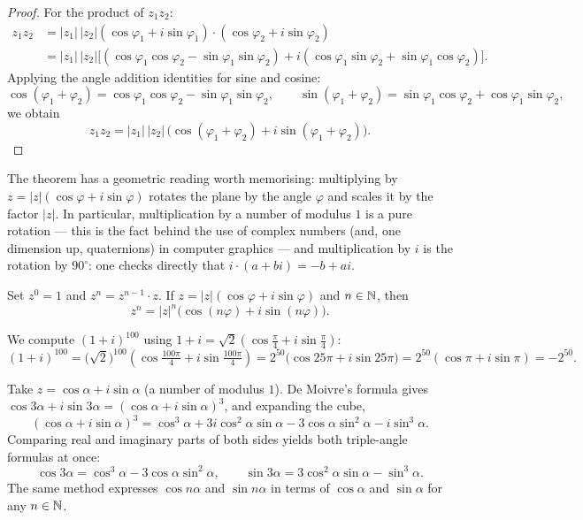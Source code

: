 \begin{proof}
For the product of $z_1 z_2$:
\begin{align*}
z_1 z_2 &= |z_1|\,|z_2|(\cos \varphi_1 + i\sin\varphi_1) \cdot (\cos \varphi_2 + i\sin\varphi_2) \\
&= |z_1|\,|z_2| \Big[ (\cos\varphi_1 \cos\varphi_2 - \sin\varphi_1 \sin\varphi_2) + i (\cos\varphi_1 \sin\varphi_2 + \sin\varphi_1 \cos\varphi_2) \Big].
\end{align*}
Applying the angle addition identities for sine and cosine:
\[
\cos(\varphi_1 + \varphi_2) = \cos\varphi_1 \cos\varphi_2 - \sin\varphi_1 \sin\varphi_2, \qquad
\sin(\varphi_1 + \varphi_2) = \sin\varphi_1 \cos\varphi_2 + \cos\varphi_1 \sin\varphi_2,
\]
we obtain
\[
z_1 z_2 = |z_1|\,|z_2|\,\big(\cos (\varphi_1+\varphi_2) + i\sin(\varphi_1+\varphi_2)\big).
\]

\end{proof}

\begin{remark}
The theorem has a geometric reading worth memorising: multiplying by $z = |z|(\cos\varphi+i\sin\varphi)$
rotates the plane by the angle $\varphi$ and scales it by the factor $|z|$. In particular, multiplication by
a number of modulus $1$ is a pure rotation — this is the fact behind the use of complex numbers (and, one
dimension up, quaternions) in computer graphics — and multiplication by $i$ is the rotation by $90^\circ$:
one checks directly that $i\cdot(a+bi) = -b+ai$.
\end{remark}

\begin{theorem}
Set $z^0 = 1$ and $z^n = z^{n-1}\cdot z$. If $z=|z|(\cos \varphi + i\sin\varphi)$ and $n\in \mathbb{N}$, then
\[
z^n = |z|^n \big(\cos (n\varphi) + i\sin(n \varphi)\big).
\]
\end{theorem}

\begin{example}
We compute $(1+i)^{100}$ using $1+i = \sqrt{2}(\cos\tfrac\pi4 + i\sin\tfrac\pi4)$:
\[
(1+i)^{100} = \big(\sqrt{2}\big)^{100}\left(\cos\tfrac{100\pi}{4} + i \sin\tfrac{100\pi}{4}\right)
= 2^{50}\big(\cos 25\pi +i \sin 25\pi\big) = 2^{50}(\cos \pi + i \sin \pi) = -2^{50}.
\]
\end{example}

\begin{example}
Take $z = \cos\alpha + i\sin\alpha$ (a number of modulus $1$). De Moivre's formula gives
$\cos 3\alpha + i \sin 3\alpha = (\cos\alpha + i \sin \alpha)^3$, and expanding the cube,
\[
(\cos\alpha + i\sin\alpha)^3
= \cos^3\alpha + 3i\cos^2\alpha \sin\alpha - 3\cos\alpha\sin^2\alpha - i\sin^3\alpha.
\]
Comparing real and imaginary parts of both sides yields both triple-angle formulas at once:
\[
\cos 3\alpha = \cos^3\alpha - 3\cos\alpha \sin^2\alpha, \qquad
\sin 3\alpha = 3\cos^2\alpha\sin\alpha - \sin^3\alpha.
\]
The same method expresses $\cos n\alpha$ and $\sin n\alpha$ in terms of $\cos\alpha$ and $\sin\alpha$ for
any $n\in\mathbb{N}$.
\end{example}

